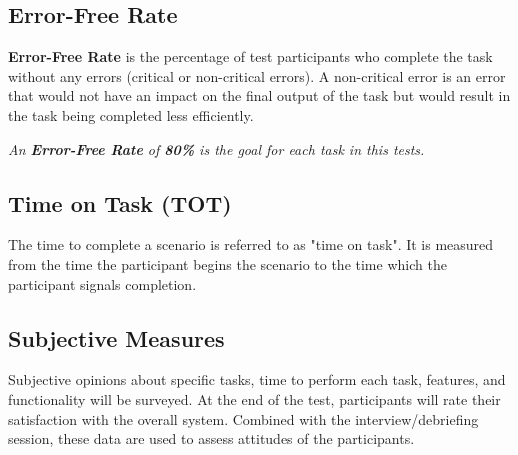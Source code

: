 

\subsection{Error-Free Rate}

\textbf{Error-Free Rate} is the percentage of test participants who complete the task without any errors (critical or non-critical errors). A non-critical error is an error that would not have an impact on the final output of the task but would result in the task being completed less efficiently.


\hfill

\textit{An \textbf{Error-Free Rate} of \textbf{80\%} is the goal for each task in this tests.}

\hfill



\subsection{Time on Task (TOT)}

The time to complete a scenario is referred to as "time on task". It is measured from the time the participant begins the scenario to the time which the participant signals completion.


\subsection{Subjective Measures}

Subjective opinions about specific tasks, time to perform each task, features, and functionality will be surveyed. At the end of the test, participants will rate their satisfaction with the overall system. Combined with the interview/debriefing session, these data are used to assess attitudes of the participants.

